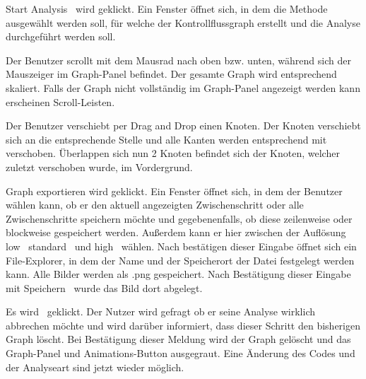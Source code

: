 {\glqq Start Analysis \grqq\ wird geklickt.}
{Ein Fenster öffnet sich, in dem die Methode ausgewählt werden soll, für welche der Kontrollflussgraph erstellt und die Analyse durchgeführt werden soll.}


\tests{}

{Der Benutzer scrollt mit dem Mausrad nach oben bzw. unten, während sich der Mauszeiger im Graph-Panel befindet.}
{Der gesamte Graph wird entsprechend skaliert. Falls der Graph nicht vollständig im Graph-Panel angezeigt werden kann erscheinen Scroll-Leisten.}

{Der Benutzer verschiebt per \glqq Drag and Drop \grqq einen Knoten.}
{Der Knoten verschiebt sich an die entsprechende Stelle und alle Kanten werden entsprechend mit verschoben. Überlappen sich nun 2 Knoten befindet sich der Knoten, welcher zuletzt verschoben wurde, im Vordergrund.}

\tests{}

{\glqq Graph exportieren \grqq\. wird geklickt.}
{Ein Fenster öffnet sich, in dem der Benutzer wählen kann, ob er den aktuell angezeigten Zwischenschritt oder alle Zwischenschritte speichern möchte und gegebenenfalls, ob diese zeilenweise oder blockweise gespeichert werden. Außerdem kann er hier zwischen der Auflösung \glqq low \grqq\, \glqq standard \grqq\ und  \glqq  high \grqq\ wählen. Nach bestätigen dieser Eingabe öffnet sich ein File-Explorer, in dem der Name und der Speicherort der Datei festgelegt werden kann. Alle Bilder werden als .png gespeichert. Nach Bestätigung dieser Eingabe mit  \glqq Speichern \grqq\ wurde das Bild dort abgelegt.}


\tests{}


{Es wird \faStop\ geklickt.}
{Der Nutzer wird gefragt ob er seine Analyse wirklich abbrechen möchte und wird darüber informiert, dass dieser Schritt den bisherigen Graph löscht. Bei Bestätigung dieser Meldung wird der Graph gelöscht und das Graph-Panel und Animations-Button ausgegraut. Eine Änderung des Codes und der Analyseart sind jetzt wieder möglich.}


